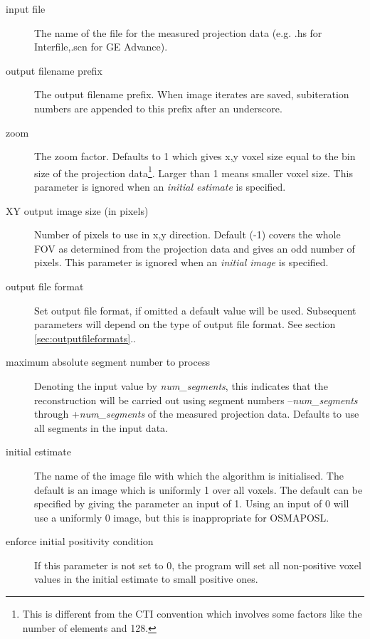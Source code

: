 \documentclass{article}
\begin{document}
\begin{description}
\item[input file]
The name of the file for the measured projection data (e.g. .hs 
for Interfile,.scn for GE Advance). 


\item[output filename prefix]
 The output filename prefix. When image iterates are saved, subiteration 
numbers are appended to this prefix after an underscore.


\item[zoom]
The zoom factor. Defaults to 1 which gives x,y voxel size equal 
to the bin size of the projection data\footnote{{\small This is different 
from the CTI convention which involves some factors like the 
number of elements and 128.}}. Larger than 1 means smaller voxel 
size. This parameter is ignored when an \textit{initial estimate} is specified.


\item[XY output image size (in pixels)]
Number of pixels to use in x,y direction. Default (-1) covers 
the whole FOV as determined from the projection data and gives 
an odd number of pixels. This parameter is ignored when an \textit{initial 
image} is specified.


\item[output file format]
Set output file format, if omitted a default value will be used. 
Subsequent parameters will depend on the type of output file 
format. See section \ref{sec:outputfileformats}..


\item[maximum absolute segment number to process]
Denoting the input value by \textit{num\_segments}, this indicates 
that the reconstruction will be carried out using segment numbers 
--\textit{num\_segments} through +\textit{num\_segments} of the measured 
projection data. Defaults to use all segments in the input data.


\item[initial estimate]
The name of the image file with which the algorithm is initialised. 
The default is an image which is uniformly 1 over all voxels. 
The default can be specified by giving the parameter an input 
of 1. Using an input of 0 will use a uniformly 0 image, but this 
is inappropriate for OSMAPOSL.


\item[enforce initial positivity condition]
If this parameter is not set to 0, the program will set all non-positive 
voxel values in the initial estimate to small positive ones.



\end{description}
\end{document}
